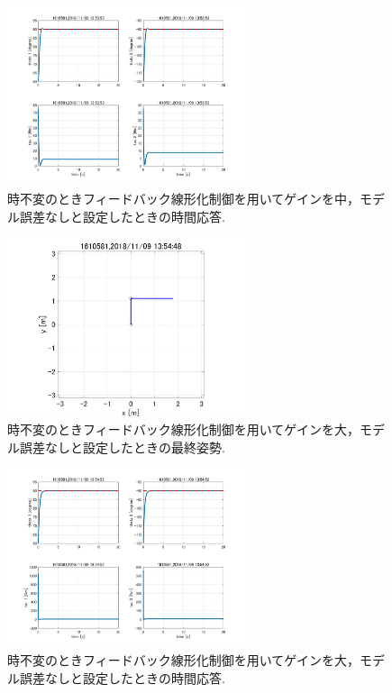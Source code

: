 \documentclass[twocolumn, 10pt,a4j]{jsarticle}
\begin{document}
    \begin{figure}[H]
      \begin{center}
        \includegraphics[width=7cm]{../img/img/kansetu_FB_zifuhen_chu_no_model_gosa_zikan_auto.jpg}
        \caption{時不変のときフィードバック線形化制御を用いてゲインを中，モデル誤差なしと設定したときの時間応答.}
      \end{center}
    \end{figure}
    \begin{figure}[H]
      \begin{center}
        \includegraphics[width=7cm]{../img/img/kansetu_FB_zifuhen_large_no_model_gosa_saisyu_sisei.jpg}
        \caption{時不変のときフィードバック線形化制御を用いてゲインを大，モデル誤差なしと設定したときの最終姿勢.}
      \end{center}
    \end{figure}

    \begin{figure}[H]
      \begin{center}
        \includegraphics[width=7cm]{../img/img/kansetu_FB_zifuhen_large_no_model_gosa_zikan_auto.jpg}
        \caption{時不変のときフィードバック線形化制御を用いてゲインを大，モデル誤差なしと設定したときの時間応答.}        
      \end{center}
    \end{figure}
\end{document}
